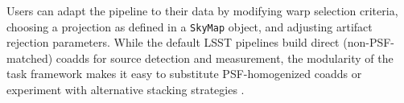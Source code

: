 Users can adapt the pipeline to their data by modifying warp selection criteria, choosing a projection as defined in a \texttt{SkyMap} object, and adjusting artifact rejection parameters.
While the default LSST pipelines build direct (non-PSF-matched) coadds for source detection and measurement, the modularity of the task framework makes it easy to substitute PSF-homogenized coadds or experiment with alternative stacking strategies \citep{DMTN-015}.
